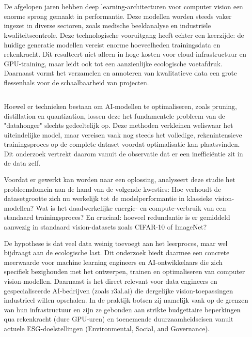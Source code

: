 
\chapter{}%
\label{ch:inleiding}

De afgelopen jaren hebben deep learning-architecturen voor computer vision een enorme sprong gemaakt in performantie. Deze modellen worden steeds vaker ingezet in diverse sectoren, zoals medische beeldanalyse en industriële kwaliteitscontrole. Deze technologische vooruitgang heeft echter een keerzijde: de huidige generatie modellen vereist enorme hoeveelheden trainingsdata en rekenkracht. Dit resulteert niet alleen in hoge kosten voor cloud-infrastructuur en GPU-training, maar leidt ook tot een aanzienlijke ecologische voetafdruk. Daarnaast vormt het verzamelen en annoteren van kwalitatieve data een grote flessenhals voor de schaalbaarheid van projecten.

\section{}%
\label{sec:probleemstelling}

Hoewel er technieken bestaan om AI-modellen te optimaliseren, zoals pruning, distillation en quantization, lossen deze het fundamentele probleem van de "datahonger" slechts gedeeltelijk op. Deze methoden verkleinen weliswaar het uiteindelijke model, maar vereisen vaak nog steeds het volledige, rekenintensieve trainingsproces op de complete dataset voordat optimalisatie kan plaatsvinden. Dit onderzoek vertrekt daarom vanuit de observatie dat er een inefficiëntie zit in de data zelf. 

Voordat er gewerkt kan worden naar een oplossing, analyseert deze studie het probleemdomein aan de hand van de volgende kwesties: Hoe verhoudt de datasetgrootte zich nu werkelijk tot de modelperformantie in klassieke vision-modellen? Wat is het daadwerkelijke energie- en compute-verbruik van een standaard trainingsproces? En cruciaal: hoeveel redundantie is er gemiddeld aanwezig in standaard vision-datasets zoals CIFAR-10 of ImageNet? 

De hypothese is dat veel data weinig toevoegt aan het leerproces, maar wel bijdraagt aan de ecologische last. Dit onderzoek biedt daarmee een concrete meerwaarde voor machine learning engineers en AI-ontwikkelaars die zich specifiek bezighouden met het ontwerpen, trainen en optimaliseren van computer vision-modellen. Daarnaast is het direct relevant voor data engineers en gespecialiseerde AI-bedrijven (zoals r3al.ai) die dergelijke vision-toepassingen industrieel willen opschalen. In de praktijk botsen zij namelijk vaak op de grenzen van hun infrastructuur en zijn ze gebonden aan strikte budgettaire beperkingen qua rekenkracht (dure GPU-uren) en toenemende duurzaamheidseisen vanuit actuele ESG-doelstellingen (Environmental, Social, and Governance).

